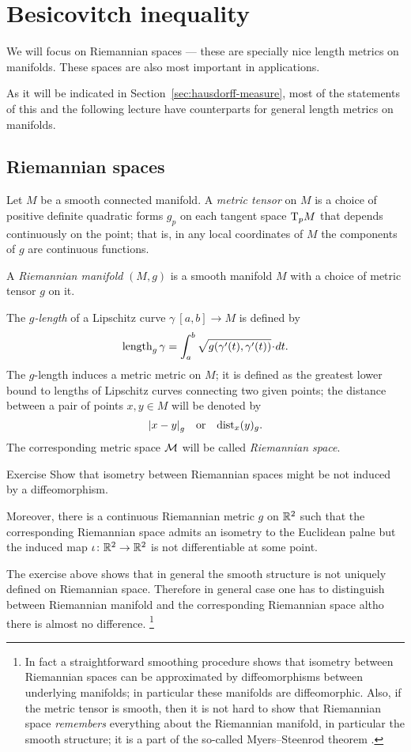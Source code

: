 \chapter{Besicovitch inequality} 

We will focus on Riemannian spaces --- these are specially nice length metrics on manifolds.
These spaces are also most important in applications.

As it will be indicated in Section~\ref{sec:hausdorff-measure},
most of the statements of this and the following lecture have counterparts for general length metrics on manifolds.

\section{Riemannian spaces}

Let $M$ be a smooth connected manifold.
A \emph{metric tensor} on $M$ is a choice of positive definite quadratic forms $g_p$ on each tangent space $\mathrm{T}_pM$ that depends continuously on the point;
that is, in any local coordinates of $M$ the components of $g$ are continuous functions.

A \emph{Riemannian manifold} $(M,g)$ is a smooth manifold $M$ with a choice of metric tensor $g$ on it.

The \emph{$g$-length} of a Lipschitz curve $\gamma\:[a,b]\to M$  is defined by
\[\length_g\gamma=\int_a^b\sqrt{g(\gamma'(t),\gamma'(t))}\cdot dt.\]
The $g$-length induces a metric metric on $M$; it is defined as the greatest lower bound to lengths of Lipschitz curves connecting two given points;
the distance between a pair of points $x,y\in M$ will be denoted by 
\[\dist{x}{y}{g}\quad\text{or}\quad\distfun_x(y)_g.\]
The corresponding metric space $\mathcal{M}$ will be called \emph{Riemannian space}.

\begin{thm}{Exercise}\label{ex:non-differentiable}
Show that isometry between Riemannian spaces might be not induced by a diffeomorphism.

Moreover, there is a continuous Riemannian metric $g$ on $\mathbb{R}^2$ such that the corresponding Riemannian space admits an isometry to the Euclidean palne but the induced map $\iota\colon\mathbb{R}^2\to\mathbb{R}^2$ is not differentiable at some point.
\end{thm}

The exercise above shows that in general the smooth structure is not uniquely defined on Riemannian space.
Therefore in general case one has to distinguish between Riemannian manifold and the corresponding Riemannian space altho there is almost no difference.%
\footnote{In fact a straightforward smoothing procedure shows that isometry between Riemannian spaces can be approximated by diffeomorphisms between underlying manifolds; in particular these manifolds are diffeomorphic.
Also, if the metric tensor is smooth, then it is not hard to show that Riemannian space {}\emph{remembers} everything about the Riemannian manifold, in particular the smooth structure;
it is a part of the so-called Myers--Steenrod theorem \cite{myers-steenrod}.} 

